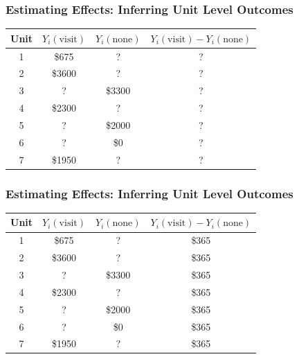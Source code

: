 \documentclass[aspectratio=169]{beamer}
\theoremstyle{principle}
\begin{document}
\begin{frame}
\frametitle{Estimating Effects: Inferring Unit Level Outcomes}
\huge
\begin{table}
\begin{tabular}{ c | c | c | c}
Unit & $Y_i(\mbox{visit})$ & $Y_i(\mbox{none})$ & $Y_i(\mbox{visit}) - Y_i(\mbox{none})$ \\
\hline
\hline
  1 & \$675 & ? & ? \\
  2 & \$3600 & ? & ? \\
  3 & ? & \$3300 & ? \\
  4 & \$2300 & ? & ? \\
  5 & ? & \$2000 & ? \\
  6 & ? & \$0 & ? \\
  7 & \$1950 & ? & ? \\
\hline
\hline
\end{tabular}
\end{table}

\end{frame}

\begin{frame}
\frametitle{Estimating Effects: Inferring Unit Level Outcomes}
\huge
\begin{table}
\begin{tabular}{ c | c | c | c}
Unit & $Y_i(\mbox{visit})$ & $Y_i(\mbox{none})$ & $Y_i(\mbox{visit}) - Y_i(\mbox{none})$ \\
\hline
\hline
  1 & \$675 & ? & \$365 \\
  2 & \$3600 & ? & \$365 \\
  3 & ? & \$3300 & \$365 \\
  4 & \$2300 & ? & \$365 \\
  5 & ? & \$2000 & \$365 \\
  6 & ? & \$0 & \$365 \\
  7 & \$1950 & ? & \$365 \\
\hline
\hline
\end{tabular}
\end{table}

\end{frame}
\end{document}
